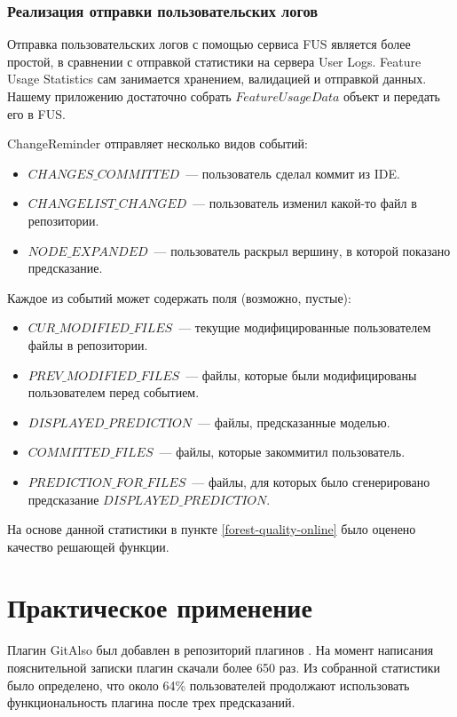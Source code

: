 \subsubsection{Реализация отправки пользовательских логов}
Отправка пользовательских логов с помощью сервиса FUS является более простой, в сравнении с отправкой статистики на сервера User Logs. Feature Usage Statistics сам занимается хранением, валидацией и отправкой данных. Нашему приложению достаточно собрать $FeatureUsageData$ объект и передать его в FUS.

ChangeReminder отправляет несколько видов событий:
    \begin{itemize}
        \item $CHANGES\_COMMITTED$~--- пользователь сделал коммит из IDE.
        \item $CHANGELIST\_CHANGED$~--- пользователь изменил какой-то файл в репозитории.
        \item $NODE\_EXPANDED$~--- пользователь раскрыл вершину, в которой показано предсказание.
    \end{itemize}
Каждое из событий может содержать поля (возможно, пустые):
    \begin{itemize}
        \item $CUR\_MODIFIED\_FILES$~--- текущие модифицированные пользователем файлы в репозитории.
        \item $PREV\_MODIFIED\_FILES$~--- файлы, которые были модифицированы пользователем перед событием.
        \item $DISPLAYED\_PREDICTION$~--- файлы, предсказанные моделью.
        \item $COMMITTED\_FILES$~--- файлы, которые закоммитил пользователь.
        \item $PREDICTION\_FOR\_FILES$~--- файлы, для которых было сгенерировано предсказание $DISPLAYED\_PREDICTION$.
    \end{itemize}
На основе данной статистики в пункте \ref{forest-quality-online} было оценено качество решающей функции.
\section{Практическое применение}
Плагин GitAlso был добавлен в репозиторий плагинов \cite{plugins-jetbrains}. На момент написания пояснительной записки плагин скачали более 650 раз. Из собранной статистики было определено, что около 64\% пользователей продолжают использовать функциональность плагина после трех предсказаний. 

